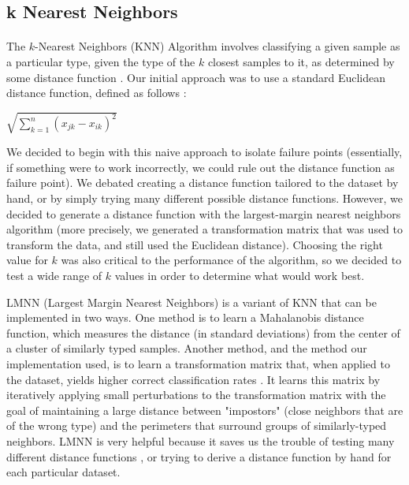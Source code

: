 \documentclass[12pt]{article}
\begin{document}
\subsection{k Nearest Neighbors}
\paragraph{}
The $k$-Nearest Neighbors (KNN) Algorithm involves classifying a given sample as a particular type, given the type of the $k$ closest samples to it, as determined by some distance function \cite{matlabpage}. Our initial approach was to use a standard Euclidean distance function, defined as follows \cite{sayad}:
\begin{center}
$\sqrt{\sum\limits_{k = 1}^n (x_{jk} - x_{ik})^2}$
\end{center}
\par
We decided to begin with this naive approach to isolate failure points (essentially, if something were to work incorrectly, we could rule out the distance function as failure point). We debated creating a distance function tailored to the dataset by hand, or by simply trying many different possible distance functions. However, we decided to generate a distance function with the largest-margin nearest neighbors algorithm (more precisely, we generated a transformation matrix that was used to transform the data, and still used the Euclidean distance). Choosing the right value for $k$ was also critical to the performance of the algorithm, so we decided to test a wide range of $k$ values in order to determine what would work best.

\par
LMNN (Largest Margin Nearest Neighbors) is a variant of KNN that can be implemented in two ways. One method is to learn a Mahalanobis distance function, which measures the distance (in standard deviations) from the center of a cluster of similarly typed samples. Another method, and the method our implementation used, is to learn a transformation matrix that, when applied to the dataset, yields higher correct classification rates \cite{huyen12}. It learns this matrix by iteratively applying small perturbations to the transformation matrix with the goal of maintaining a large distance between "impostors" (close neighbors that are of the wrong type) and the perimeters that surround groups of similarly-typed neighbors. LMNN is very helpful because it saves us the trouble of testing many different distance functions \cite{weinberger}, or trying to derive a distance function by hand for each particular dataset.
    
\end{document}
